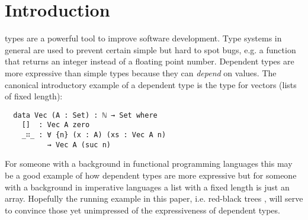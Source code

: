 \documentclass[journal, retainorgcmds]{../IEEEtemplate/IEEEtran}
\begin{document}
%


\section{Introduction}
 types are a powerful tool to improve software
development.
Type systems in general are used to prevent certain simple but hard to spot
bugs, e.g. a function that returns an integer instead of a floating point
number.
Dependent types are more expressive than simple types because they can
\emph{depend} on values.
The canonical introductory example of a dependent type is the type for vectors
(lists of fixed length):

\begin{verbatim}
  data Vec (A : Set) : ℕ → Set where
    []  : Vec A zero
    _∷_ : ∀ {n} (x : A) (xs : Vec A n)
          → Vec A (suc n)
\end{verbatim}

For someone with a background in functional programming languages this may be
a good example of how dependent types are more expressive but for someone with a
background in imperative languages a list with a fixed length is
just an array.
Hopefully the running example in this paper, i.e. red-black trees
\cite{rbtrees}, will serve to convince those yet unimpressed of the
expressiveness of dependent types.
\end{document}
